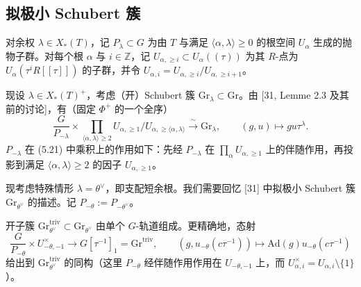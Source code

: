 
\subsection{拟极小 Schubert 簇}

对余权 $\lambda\in X_*(T)$，记 $P_\lambda\subset G$ 为由 $T$ 与满足 $\langle\alpha,\lambda\rangle\ge 0$ 的根空间 $U_\alpha$ 生成的抛物子群。对每个根 $\alpha$ 与 $i\in\mathbb{Z}$，记 $U_{\alpha,\ge i}\subset U_\alpha((\tau))$ 为其 $R$-点为 $U_\alpha(\tau^iR[[\tau]])$ 的子群，并令 $U_{\alpha,i}=U_{\alpha,\ge i}/U_{\alpha,\ge i+1}$。

现设 $\lambda\in X_*(T)^+$，考虑（开）Schubert 簇 $\mathrm{Gr}_\lambda\subset\mathrm{Gr}$。由 [31, Lemme 2.3 及其前的讨论]，有（固定 $\Phi^+$ 的一个全序）
\begin{equation}
\frac{G}{P_{-\lambda}}\times\prod_{\langle\alpha,\lambda\rangle\ge 2}U_{\alpha,\ge 1}\big/U_{\alpha,\ge\langle\alpha,\lambda\rangle}\xrightarrow{\ \sim\ }\mathrm{Gr}_\lambda,\qquad (g,u)\mapsto gu\tau^\lambda.
\end{equation}
$P_{-\lambda}$ 在 (5.21) 中乘积上的作用如下：先经 $P_{-\lambda}$ 在 $\prod_\alpha U_{\alpha,\ge 1}$ 上的伴随作用，再投影到满足 $\langle\alpha,\lambda\rangle\ge 2$ 的因子 $U_{\alpha,\ge 1}$。

现考虑特殊情形 $\lambda=\theta^\vee$，即支配短余根。我们需要回忆 [31] 中拟极小 Schubert 簇 $\mathrm{Gr}_{\theta^\vee}$ 的描述。记 $P_{-\theta}:=P_{-\theta^\vee}$。

\begin{lemma}
开子簇 $\mathrm{Gr}^{\mathrm{triv}}_{\theta^\vee}\subset\mathrm{Gr}_{\theta^\vee}$ 由单个 $G$-轨道组成。更精确地，态射
\[
\frac{G}{P_{-\theta}}\times U^\times_{-\theta,-1}\to G[\tau^{-1}]_1=\mathrm{Gr}^{\mathrm{triv}},\qquad (g,u_{-\theta}(c\tau^{-1}))\mapsto\mathrm{Ad}(g)u_{-\theta}(c\tau^{-1})
\]
给出到 $\mathrm{Gr}^{\mathrm{triv}}_{\theta^\vee}$ 的同构（这里 $P_{-\theta}$ 经伴随作用作用在 $U_{-\theta,-1}$ 上，而 $U^\times_{\alpha,i}=U_{\alpha,i}\setminus\{1\}$）。
\end{lemma}

